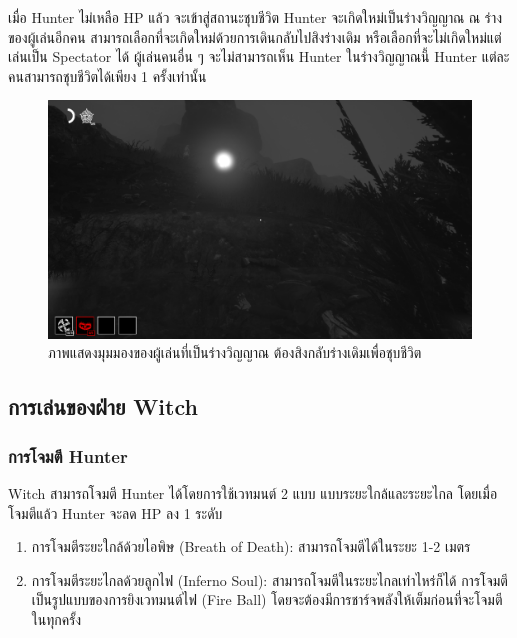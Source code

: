 เมื่อ Hunter ไม่เหลือ HP แล้ว จะเข้าสู่สถานะชุบชีวิต Hunter จะเกิดใหม่เป็นร่างวิญญาณ ณ ร่างของผู้เล่นอีกคน 
สามารถเลือกที่จะเกิดใหม่ด้วยการเดินกลับไปสิงร่างเดิม หรือเลือกที่จะไม่เกิดใหม่แต่เล่นเป็น Spectator ได้ ผู้เล่นคนอื่น ๆ 
จะไม่สามารถเห็น Hunter ในร่างวิญญาณนี้ Hunter แต่ละคนสามารถชุบชีวิตได้เพียง 1 ครั้งเท่านั้น

\begin{figure}[p]
  \begin{center}
  \includegraphics[width=\textwidth]{./img/mechanics/revive.png}
  \end{center}
  \caption[ภาพแสดงมุมมองของผู้เล่นที่เป็นร่างวิญญาณ ต้องสิงกลับร่างเดิมเพื่อชุบชีวิต]{ภาพแสดงมุมมองของผู้เล่นที่เป็นร่างวิญญาณ ต้องสิงกลับร่างเดิมเพื่อชุบชีวิต}
  \label{ภาพแสดงมุมมองของผู้เล่นที่เป็นร่างวิญญาณ ต้องสิงกลับร่างเดิมเพื่อชุบชีวิต}
\end{figure}

\subsection{การเล่นของฝ่าย Witch}

\subsubsection{การโจมตี Hunter}

Witch สามารถโจมตี Hunter ได้โดยการใช้เวทมนต์ 2 แบบ แบบระยะใกล้และระยะไกล โดยเมื่อโจมตีแล้ว 
Hunter จะลด HP ลง 1 ระดับ

\begin{enumerate}
  \item การโจมตีระยะใกล้ด้วยไอพิษ (Breath of Death): สามารถโจมตีได้ในระยะ 1-2 เมตร
  \item การโจมตีระยะไกลด้วยลูกไฟ (Inferno Soul): สามารถโจมตีในระยะไกลเท่าไหร่ก็ได้ การโจมตีเป็นรูปแบบของการยิงเวทมนต์ไฟ
(Fire Ball) โดยจะต้องมีการชาร์จพลังให้เต็มก่อนที่จะโจมตีในทุกครั้ง
\end{enumerate}

